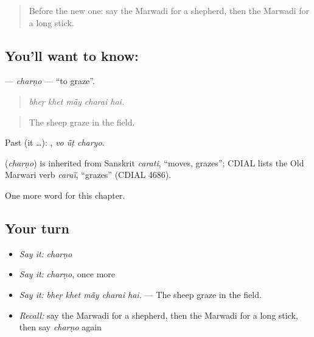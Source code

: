\begin{quote}
Before the new one: say the Marwadi for a shepherd, then the Marwadi for a long stick.
\end{quote}

\subsection*{You'll want to know: }
\textbf{} — \emph{charṇo} — \textquotedblleft{}to graze\textquotedblright{}.

\begin{quote}
    
\end{quote}

\begin{quote}
\emph{bheṛ khet mā̃y charai hai.}
\end{quote}

\begin{quote}
The sheep graze in the field.
\end{quote}

Past (it …):   , \emph{vo ū̃ṭ charyo}.

\begin{cousinweb}
\textbf{} (\emph{charṇo}) is inherited from Sanskrit \emph{carati}, \textquotedblleft{}moves, grazes\textquotedblright{}; CDIAL lists the Old Marwari verb \emph{caraï}, \textquotedblleft{}grazes\textquotedblright{} (CDIAL 4686).
\end{cousinweb}

\begin{grammarlens}[title={What you've built}]
One more word for this chapter.
\end{grammarlens}

\subsection*{Your turn}
\begin{itemize}
\raggedright
  \item \emph{Say it:} \emph{charṇo}
  \item \emph{Say it:} \emph{charṇo}, once more
  \item \emph{Say it:} \emph{bheṛ khet mā̃y charai hai.} — The sheep graze in the field.
  \item \emph{Recall:} say the Marwadi for a shepherd, then the Marwadi for a long stick, then say \emph{charṇo} again
\end{itemize}

